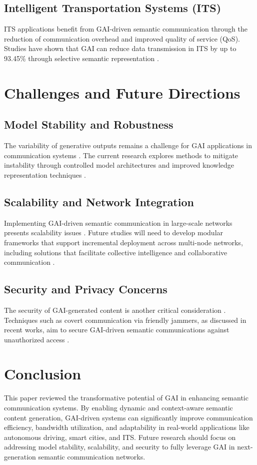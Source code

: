 \documentclass[journal]{IEEEtran}
\begin{document}
\subsection{Intelligent Transportation Systems (ITS)}
ITS applications benefit from GAI-driven semantic communication through the reduction of communication overhead and improved quality of service (QoS). Studies have shown that GAI can reduce data transmission in ITS by up to 93.45\% through selective semantic representation \cite{10634888,raha2023generativeaidrivensemanticcommunication}.

\section{Challenges and Future Directions}

\subsection{Model Stability and Robustness}
The variability of generative outputs remains a challenge for GAI applications in communication systems \cite{10447237}. The current research explores methods to mitigate instability through controlled model architectures and improved knowledge representation techniques \cite{Thomas2023CausalRC}.

\subsection{Scalability and Network Integration}
Implementing GAI-driven semantic communication in large-scale networks presents scalability issues \cite{jiang2024largeaimodelbasedsemantic}. Future studies will need to develop modular frameworks that support incremental deployment across multi-node networks, including solutions that facilitate collective intelligence and collaborative communication \cite{10634888}.

\subsection{Security and Privacy Concerns}
The security of GAI-generated content is another critical consideration \cite{10447237}. Techniques such as covert communication via friendly jammers, as discussed in recent works, aim to secure GAI-driven semantic communications against unauthorized access \cite{9797984}.

\section{Conclusion}
This paper reviewed the transformative potential of GAI in enhancing semantic communication systems. By enabling dynamic and context-aware semantic content generation, GAI-driven systems can significantly improve communication efficiency, bandwidth utilization, and adaptability in real-world applications like autonomous driving, smart cities, and ITS. Future research should focus on addressing model stability, scalability, and security to fully leverage GAI in next-generation semantic communication networks.



\end{document}
